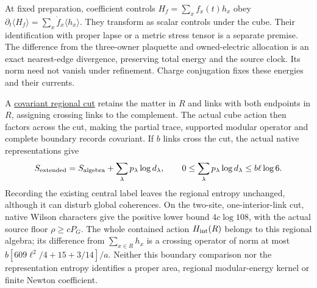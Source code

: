 At fixed preparation, coefficient controls $H_f=\sum_x f_x(t)h_x$ obey
$\partial_t\langle H_f\rangle=\sum_x\dot f_x\langle h_x\rangle$.
They transform as scalar controls under the cube. Their identification
with proper lapse or a metric stress tensor is a separate premise.
The difference from the three-owner plaquette and owned-electric
allocation is an exact nearest-edge divergence, preserving total energy
and the source clock. Its norm need not vanish under refinement.
Charge conjugation fixes these energies and their currents.

A \href{https://github.com/FloatingPragma/observer-patch-holography/blob/main/model/particle_primary_geometric_cut/PROOF.md}{covariant regional cut}
retains the matter in $R$ and links with both endpoints in $R$, assigning
crossing links to the complement. The actual cube action then factors
across the cut, making the partial trace, supported modular operator
and complete boundary records covariant. If $b$ links cross the cut,
the actual native representations give
\[
 S_{\rm extended}=S_{\rm algebra}+\sum_\lambda p_\lambda\log d_\lambda,
 \qquad 0\le\sum_\lambda p_\lambda\log d_\lambda\le b\ell\log6.
\]
Recording the existing central label leaves the regional entropy
unchanged, although it can disturb global coherences. On the two-site,
one-interior-link cut, native Wilson characters give the positive lower
bound $4c\log108$, with the actual source floor $\rho\ge cP_G$.
The whole contained action $H_{\rm int}(R)$ belongs to this regional
algebra; its difference from $\sum_{x\in R}h_x$ is a crossing operator
of norm at most $b[609\ell^2/4+15+3/14]/a$. Neither this boundary
comparison nor the representation entropy identifies a proper area,
regional modular-energy kernel or finite Newton coefficient.

